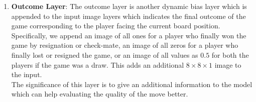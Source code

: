 \begin{enumerate}
\item \textbf{Outcome Layer}: The outcome layer is another dynamic bias layer 
which is appended to the input image layers which indicates the final outcome 
of 
the game corresponding to the player facing the current board position. 
Specifically, we append an image of all ones for a player who finally won the 
game by resignation or check-mate, an image of all zeros for a player who 
finally lost or resigned the game, or an image of all values as $0.5$ for both 
the players if the game was a draw. This adds an additional $8\times 8\times 1$ 
image to the input.\\
The significance of this layer is to give an additional information to the 
model 
which can help evaluating the quality of the move better.\\

\end{enumerate}


